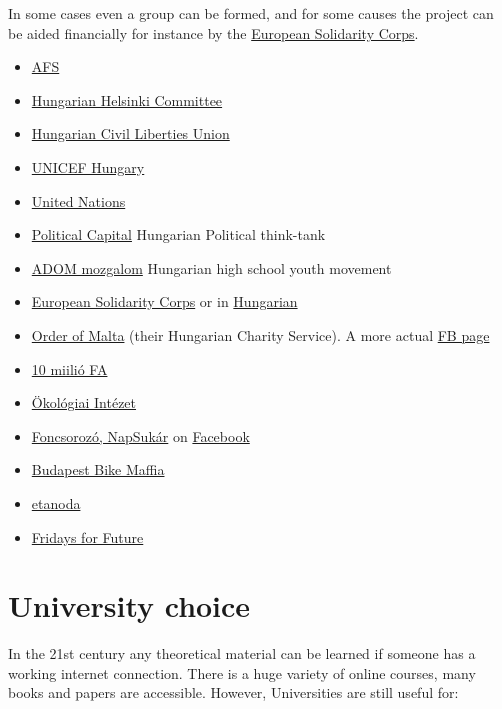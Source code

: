 \documentclass{article}
\begin{document}
In some cases even a group can be formed, and for some causes the project can be aided financially for instance by the \href{https://europa.eu/youth/solidarity/solidarity_projects_en}{European Solidarity Corps}.
\begin{itemize}
    \item \href{https://afs.org/}{AFS}
    \item \href{https://helsinki.hu/en/support/apply-to-volunteer/}{Hungarian Helsinki Committee}
    \item \href{https://hclu.hu/en/about-us}{Hungarian Civil Liberties Union}
    \item \href{https://unicef.hu/igy-segithetsz/onkentes}{UNICEF Hungary}
    \item \href{https://www.unv.org/}{United Nations}
    \item \href{https://www.politicalcapital.hu/}{Political Capital} Hungarian Political think-tank
    \item \href{https://adommozgalom.hu/}{ADOM mozgalom} Hungarian high school youth movement
    \item \href{https://europa.eu/youth/solidarity_en}{European Solidarity Corps} or in \href{http://eplusifjusag.hu/hu/esc}{Hungarian}
    \item \href{https://maltai.hu/onkentesseg}{Order of Malta} (their Hungarian Charity Service). A more actual \href{https://www.facebook.com/maltai.szeretetszolgalat/}{FB page}
    \item \href{https://10milliofa.hu/}{10 miilió FA}
    \item \href{https://www.ecolinst.hu/index.php}{Ökológiai Intézet}
    \item \href{https://web.archive.org/web/20171124170411/http://foncsorozo.hu/napsukar/}{Foncsorozó, NapSukár} on \href{https://www.facebook.com/napsukar/}{Facebook}
    \item \href{https://bikemaffia.com/}{Budapest Bike Maffia}
    \item \href{http://www.etanoda.hu/segits_oktatassal_gyere_hozzank_mentornak_207}{etanoda}
    \item \href{https://fridaysforfuture.org/}{Fridays for Future}
\end{itemize}

\section{University choice}

In the 21st century any theoretical material can be learned if someone has a working internet connection. There is a huge variety of online courses, many books and papers are accessible. However, Universities are still useful for:
\end{document}

